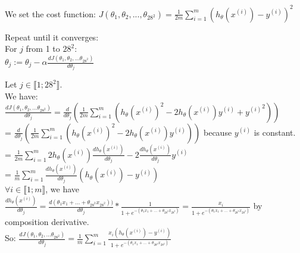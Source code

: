 \documentclass{beamer}
\begin{document}
	\vspace{0.3cm}We set the cost function: $J(\theta_1, \theta_2, ..., \theta_{28^2}) = \frac{1}{2m}\sum_{i=1}^{m}(h_\theta(x^{(i)}) - y^{(i)})^2$
	
	\vspace{0.3cm}Repeat until it converges:\\
	For $j$ from 1 to $28^2$:\\
	$\theta_j := \theta_j - \alpha\frac{dJ(\theta_1, \theta_2, ... \theta_{28^2})}{d\theta_j}$
	
	\newpage
	
	Let $j \in \llbracket 1; 28^2 \rrbracket$.\\
	We have:\\
	$\frac{dJ(\theta_1, \theta_2, ... \theta_{28^2})}{d\theta_j} = \frac{d}{d\theta_j}(\frac{1}{2m}\sum_{i=1}^{m}(h_\theta(x^{(i)})^2 - 2 h_\theta(x^{(i)}) y^{(i)} + {y^{(i)}}^2))$\\
	= $\frac{d}{d\theta_j}(\frac{1}{2m}\sum_{i=1}^{m}(h_\theta(x^{(i)})^2 - 2 h_\theta(x^{(i)}) y^{(i)}))$ because $y^{(i)}$ is constant.\\
	= $\frac{1}{2m}\sum_{i=1}^{m}2h_\theta(x^{(i)})\frac{dh_\theta(x^{(i)})}{d\theta_j} - 2 \frac{dh_\theta(x^{(i)})}{d\theta_j} y^{(i)}$\\
	= $\frac{1}{m}\sum_{i=1}^{m}\frac{dh_\theta(x^{(i)})}{d\theta_j}(h_\theta(x^{(i)}) - y^{(i)})$\\
	
	\vspace{0.3cm}$\forall i \in \llbracket 1; m \rrbracket$, we have $\frac{dh_\theta(x^{(i)})}{d\theta_j} = \frac{d(\theta_1 x_1 + ... + \theta_{28^2} x_{28^2}))}{d\theta_j} * \frac{1}{1+e^{-(\theta_1 x_1 + ... + \theta_{28^2} x_{28^2})}} = \frac{x_i}{1 + e^{-(\theta_1 x_1 + ... + \theta_{28^2} x_{28^2})}}$ by composition derivative.\\
	
	\vspace{0.3cm}So: $\frac{dJ(\theta_1, \theta_2, ... \theta_{28^2})}{d\theta_j} = \frac{1}{m}\sum_{i=1}^{m} \frac{x_i (h_\theta(x^{(i)}) - y^{(i)})}{1 + e^{-(\theta_1 x_1 + ... + \theta_{28^2} x_{28^2})}}$

	\newpage
\end{document}
